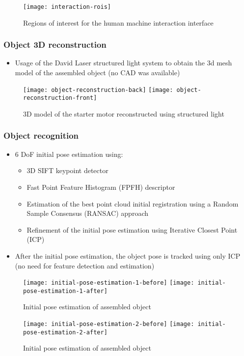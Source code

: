 \begin{figure}
	\centering
	\texttt{[image: interaction-rois]}
	\caption{Regions of interest for the human machine interaction interface}
	\label{fig:interaction-rois}
\end{figure}



\subsubsection{Object 3D reconstruction}

\begin{itemize}
	\item Usage of the David Laser structured light system to obtain the 3d mesh model of the assembled object (no CAD was available)
\end{itemize}

\begin{figure}[ht]
	\centering
	\texttt{[image: object-reconstruction-back]}
	\texttt{[image: object-reconstruction-front]}
	\caption{3D model of the starter motor reconstructed using structured light}
\end{figure}


\subsubsection{Object recognition}

\begin{itemize}
	\item 6 DoF initial pose estimation using:
	\begin{itemize}
		\item 3D SIFT keypoint detector
		\item Fast Point Feature Histogram (FPFH) descriptor
		\item Estimation of the best point cloud initial registration using a Random Sample Consensus (RANSAC) approach
		\item Refinement of the initial pose estimation using Iterative Closest Point (ICP)
	\end{itemize}
	\item After the initial pose estimation, the object pose is tracked using only ICP (no need for feature detection and estimation)
\end{itemize}

\begin{figure}[!ht]
	\centering
	\texttt{[image: initial-pose-estimation-1-before]}
	\hspace{0.5em}
	\texttt{[image: initial-pose-estimation-1-after]}
	\caption{Initial pose estimation of assembled object}
\end{figure}

\begin{figure}[!ht]
	\centering
	\texttt{[image: initial-pose-estimation-2-before]}
	\hspace{0.5em}
	\texttt{[image: initial-pose-estimation-2-after]}
	\caption{Initial pose estimation of assembled object}
\end{figure}
